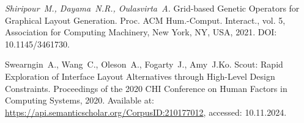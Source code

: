 \newpage
{}
{\em Shiripour~M., Dayama~N.R., Oulasvirta~A.} Grid-based Genetic Operators for Graphical Layout Generation. Proc. ACM Hum.-Comput. Interact., vol. 5, Association for Computing Machinery, New York, NY, USA, 2021. DOI: 10.1145/3461730.

{\em }Swearngin~A., Wang~C., Oleson~A., Fogarty~J., Amy~J.Ko. Scout: Rapid Exploration of Interface Layout Alternatives through High-Level Design Constraints. Proceedings of the 2020 CHI Conference on Human Factors in Computing Systems, 2020. Available at: \url{https://api.semanticscholar.org/CorpusID:210177012}, accessed: 10.11.2024.
